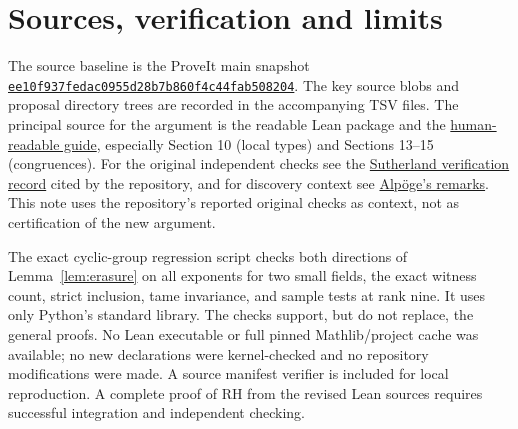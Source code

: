 \documentclass[11pt]{article}
\theoremstyle{definition}\newtheorem{definition}[theorem]{Definition}
\begin{document}
\section*{Sources, verification and limits}
The source baseline is the ProveIt main snapshot \href{https://github.com/VladimirReshetnikov/ProveIt/tree/ee10f937fedac0955d28b7b860f4c44fab508204/Analysis/GeneralizedRiemannHypothesis}{\texttt{ee10f937fedac0955d28b7b860f4c44fab508204}}. The key source blobs and proposal directory trees are recorded in the accompanying TSV files. The principal source for the argument is the readable Lean package and the \href{https://github.com/VladimirReshetnikov/ProveIt/blob/ee10f937fedac0955d28b7b860f4c44fab508204/Analysis/GeneralizedRiemannHypothesis/docs/guide/theta_lifts_and_dirichlet_zeros.tex}{human-readable guide}, especially Section 10 (local types) and Sections 13--15 (congruences). For the original independent checks see the \href{https://math.mit.edu/~drew/shortgrh/}{Sutherland verification record} cited by the repository, and for discovery context see \href{https://alpo.ge/remark.pdf}{Alp\"oge's remarks}. This note uses the repository's reported original checks as context, not as certification of the new argument.

The exact cyclic-group regression script checks both directions of Lemma~\ref{lem:erasure} on all exponents for two small fields, the exact witness count, strict inclusion, tame invariance, and sample tests at rank nine. It uses only Python's standard library. The checks support, but do not replace, the general proofs. No Lean executable or full pinned Mathlib/project cache was available; no new declarations were kernel-checked and no repository modifications were made. A source manifest verifier is included for local reproduction. A complete proof of RH from the revised Lean sources requires successful integration and independent checking.
\end{document}

